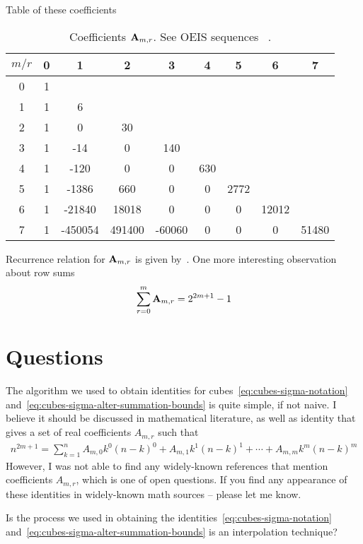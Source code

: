 Table of these coefficients

\begin{table}[H]
    \begin{center}
        \setlength\extrarowheight{-6pt}
        \begin{tabular}{c|cccccccc}
            $m/r$ & 0 & 1       & 2      & 3      & 4   & 5    & 6     & 7 \\ [3px]
            \hline
            0     & 1 &         &        &        &     &      &       &       \\
            1     & 1 & 6       &        &        &     &      &       &       \\
            2     & 1 & 0       & 30     &        &     &      &       &       \\
            3     & 1 & -14     & 0      & 140    &     &      &       &       \\
            4     & 1 & -120    & 0      & 0      & 630 &      &       &       \\
            5     & 1 & -1386   & 660    & 0      & 0   & 2772 &       &       \\
            6     & 1 & -21840  & 18018  & 0      & 0   & 0    & 12012 &       \\
            7     & 1 & -450054 & 491400 & -60060 & 0   & 0    & 0     & 51480
        \end{tabular}
    \end{center}
    \caption{Coefficients ${\mathbf{A}} \sb{m,r}$. See OEIS sequences
    ~\cite{oeis_numerators_of_the_coefficient_a_m_r,oeis_denominators_of_the_coefficient_a_m_r}.}
    \label{tab:table_of_coefficients_a}
\end{table}

Recurrence relation for ${\mathbf{A}} \sb{m,r}$ is given by~\cite{alekseyev2018mathoverflow}.
One more interesting observation about row sums
\begin{align*}
    \sum_{r=0}^{m} {\mathbf{A}} \sb{m,r} = 2^{2m+1} - 1
\end{align*}

\section{Questions}\label{sec:questions}

\begin{question}
    The algorithm we used to obtain identities for
    cubes~\eqref{eq:cubes-sigma-notation} and~\eqref{eq:cubes-sigma-alter-summation-bounds}
    is quite simple, if not naive.
    I believe it should be discussed in mathematical literature, as well as identity
    that gives a set of real coefficients $A_{m,r}$ such that
    \begin{align*}
        n^{2m+1} = \sum_{k=1}^{n} A_{m,0} k^0 (n-k)^0 + A_{m,1} k^1 (n-k)^1
        + \cdots + A_{m,m} k^m (n-k)^m
    \end{align*}
    However, I was not able to find any widely-known references that mention coefficients $A_{m,r}$,
    which is one of open questions.
    If you find any appearance of these identities in widely-known math sources -- please let me know.
\end{question}

\begin{question}
    Is the process we used in obtaining the identities~\eqref{eq:cubes-sigma-notation} and~\eqref{eq:cubes-sigma-alter-summation-bounds}
    is an interpolation technique?
\end{question}
